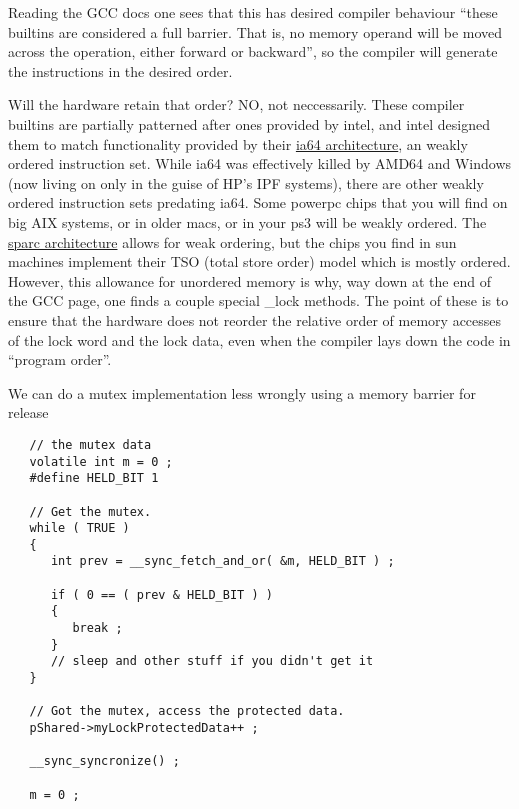 Reading the GCC docs one sees that this has desired compiler behaviour ``these builtins are considered a full barrier. That is, no memory operand will be moved across the operation, either forward or backward'', so the compiler will generate the instructions in the desired order.

Will the hardware retain that order?  NO, not neccessarily.  These compiler builtins are partially patterned after ones provided by intel, and intel designed them to match functionality provided by their \href{http://www.intel.com/design/itanium/manuals/245319.htm}{ia64 architecture}, an weakly ordered instruction set.  While ia64 was effectively killed by AMD64 and Windows (now living on only in the guise of HP's IPF systems), there are other weakly ordered instruction sets predating ia64.  Some powerpc chips that you will find on big AIX systems, or in older macs, or in your ps3 will be weakly ordered.  The \href{http://developers.sun.com/solaris/articles/sparcv9.pdf}{sparc architecture} allows for weak ordering, but the chips you find in sun machines implement their TSO (total store order) model which is mostly ordered.  However, this allowance for unordered memory is why, way down at the end of the GCC page, one finds a couple special \_lock methods.  The point of these is to ensure that the hardware does not reorder the relative order of memory accesses of the lock word and the lock data, even when the compiler lays down the code in ``program order''.

We can do a mutex implementation less wrongly using a memory barrier for release

\begin{lstlisting}
   // the mutex data
   volatile int m = 0 ;
   #define HELD_BIT 1

   // Get the mutex.
   while ( TRUE )
   {
      int prev = __sync_fetch_and_or( &m, HELD_BIT ) ;

      if ( 0 == ( prev & HELD_BIT ) )
      {
         break ;
      }
      // sleep and other stuff if you didn't get it
   }

   // Got the mutex, access the protected data.
   pShared->myLockProtectedData++ ;

   __sync_syncronize() ; 

   m = 0 ;
\end{lstlisting} 

